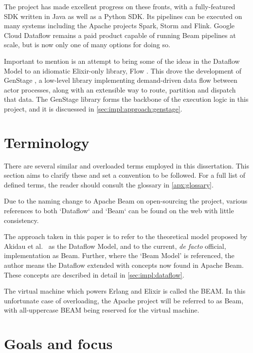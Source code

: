 The project has made excellent progress on these fronts, with a fully-featured SDK written in Java as well as a Python SDK.
Its pipelines can be executed on many systems including the Apache projects Spark, Storm and Flink.
Google Cloud Dataflow remains a paid product capable of running Beam pipelines at scale, but is now only one of many options for doing so.

Important to mention is an attempt to bring some of the ideas in the Dataflow Model to an idiomatic Elixir-only library, Flow \cite{ElixirFlow}.
This drove the development of GenStage \cite{ElixirGenStage}, a low-level library implementing demand-driven data flow between actor processes, along with an extensible way to route, partition and dispatch that data.
The GenStage library forms the backbone of the execution logic in this project, and it is discuessed in \cref{sec:impl:approach:genstage}.

\section{Terminology}\label{sec:intro:terminology}

There are several similar and overloaded terms employed in this dissertation.
This section aims to clarify these and set a convention to be followed.
For a full list of defined terms, the reader should consult the glossary in \cref{apx:glossary}.


Due to the naming change to Apache Beam on open-sourcing the project, various references to both `Dataflow` and `Beam` can be found on the web with little consistency.

The approach taken in this paper is to refer to the theoretical model proposed by Akidau et al.\ \cite{Akidau:2015} as the Dataflow Model, and to the current, \emph{de facto} official, implementation \cite{ApacheBeam} as Beam.
Further, where the `Beam Model' is referenced, the author means the Dataflow extended with concepts now found in Apache Beam.
These concepts are described in detail in \cref{sec:impl:dataflow}.

The virtual machine which powers Erlang and Elixir is called the BEAM.
In this unfortunate case of overloading, the Apache project will be referred to as Beam, with all-uppercase BEAM being reserved for the virtual machine.

\section{Goals and focus}\label{sec:intro:goals}

